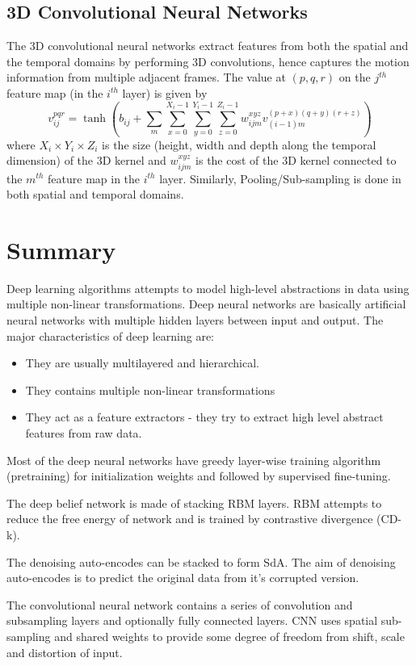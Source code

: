 \subsection{3D Convolutional Neural Networks}
The 3D convolutional neural networks extract features from both the spatial and the temporal domains by performing 3D convolutions, hence captures the motion information from multiple adjacent frames.\cite{ji20133d} The value at $(p, q, r)$ on the $j^{th}$ feature map (in the $i^{th}$ layer) is given by
$$v^{pqr}_{ij} = \tanh(b_{ij}+\sum_{m} \sum_{x=0}^{X_i-1} \sum_{y=0}^{Y_i-1} \sum_{z=0}^{Z_i-1} w^{xyz}_{ijm} v^{(p+x)(q+y)(r+z)}_{(i−1)m}) $$
where $X_i \times Y_i \times Z_i$ is the size (height, width and depth  along the temporal dimension) of the 3D kernel and $w^{xyz}_{ijm}$ is the cost of the 3D kernel connected to the $m^{th}$ feature map in the $i^{th}$ layer. Similarly, Pooling/Sub-sampling is done in both spatial and temporal domains.

\section{Summary}
Deep learning algorithms attempts to model high-level abstractions in data using multiple non-linear transformations. Deep neural networks are basically artificial neural networks with multiple hidden layers between input and output. The major characteristics of deep learning are:
\begin{itemize}
\item They are usually multilayered and hierarchical.
\item They contains multiple non-linear transformations 
\item They act as a feature extractors - they try to extract high level abstract features from raw data.
\end{itemize}

Most of the deep neural networks have greedy layer-wise training algorithm (pretraining) for initialization weights and followed by supervised fine-tuning.
 
The deep belief network is made of stacking RBM layers. RBM attempts to reduce the free energy of network and is trained by contrastive divergence (CD-k).

The denoising auto-encodes can be stacked to form SdA. The aim of denoising auto-encodes is to predict the original data from it's corrupted version.

The convolutional neural network contains a series of convolution and subsampling layers and optionally fully connected layers. CNN uses spatial sub-sampling and shared weights to provide some degree of freedom from shift, scale and distortion of input.
